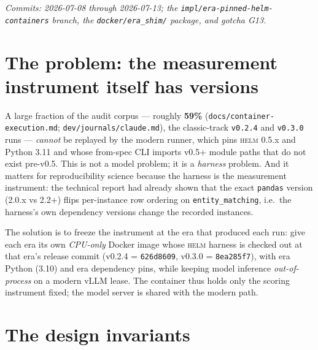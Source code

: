 \documentclass[11pt]{report}
\newcommand{\code}[1]{\texttt{#1}}
\newcommand{\file}[1]{\texttt{#1}}
\begin{document}
\emph{Commits: 2026-07-08 through 2026-07-13; the
\code{impl/era-pinned-helm-containers} branch, the \code{docker/era\_shim/}
package, and gotcha G13.}

\section{The problem: the measurement instrument itself has versions}

A large fraction of the audit corpus --- roughly \textbf{59\%}
(\file{docs/container-execution.md}; \file{dev/journals/claude.md}), the classic-track
\code{v0.2.4} and \code{v0.3.0} runs --- \emph{cannot} be replayed by the modern
runner, which pins \textsc{helm} 0.5.x and Python 3.11 and whose from-spec CLI
imports v0.5+ module paths that do not exist pre-v0.5. This is not a model problem;
it is a \emph{harness} problem. And it matters for reproducibility science because
the harness is the measurement instrument: the technical report had already shown
that the exact \code{pandas} version (2.0.x vs 2.2+) flips per-instance row
ordering on \code{entity\_matching}, i.e.\ the harness's own dependency versions
change the recorded instances.

The solution is to freeze the instrument at the era that produced each run: give
each era its own \emph{CPU-only} Docker image whose \textsc{helm} harness is
checked out at that era's release commit (v0.2.4 = \code{626d8609}, v0.3.0 =
\code{8ea285f7}), with era Python (3.10) and era dependency pins, while keeping
model inference \emph{out-of-process} on a modern vLLM lease. The container thus
holds only the scoring instrument fixed; the model server is shared with the
modern path.

\section{The design invariants}
\end{document}
